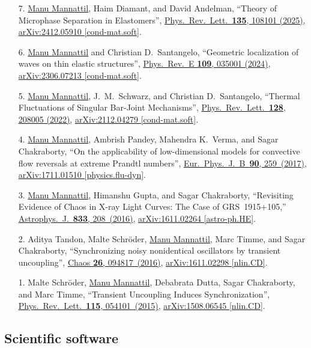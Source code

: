 \documentclass[10pt,article,oneside]{memoir}
\def\bname{\underline{Manu Mannattil}}    %
\def\doi#1#2{\href{https://doi.org/#1}{#2}}
\def\arxiv#1#2{\href{https://arxiv.org/abs/#1}{arXiv:#1 [#2]}}
\begin{document}
\begin{enumerate}
  \item[7.]
    \bname, Haim Diamant, and David Andelman,
    ``Theory of Microphase Separation in Elastomers'',
    \doi{10.1103/5q7m-3fpn}{Phys.~Rev.~Lett.~\textbf{135}, 108101 (2025)},
    \arxiv{2412.05910}{cond-mat.soft}.

  \item[6.]
    {\bname} and Christian D.~Santangelo,
    ``Geometric localization of waves on thin elastic structures'',
    \doi{10.1103/PhysRevE.109.035001}{Phys.~Rev.~E \textbf{109}, 035001 (2024)},
    \arxiv{2306.07213}{cond-mat.soft}.

  \item[5.]
    \bname, J.~M.~Schwarz, and Christian D.~Santangelo,
    ``Thermal Fluctuations of Singular Bar-Joint Mechanisms'',
    \doi{10.1103/PhysRevLett.128.208005}{Phys.~Rev.~Lett.~\textbf{128}, 208005 (2022)},
    \arxiv{2112.04279}{cond-mat.soft}.

  \item[4.]
    \bname, Ambrish Pandey, Mahendra K.~Verma, and Sagar Chakraborty,
    ``On the applicability of low-dimensional models for convective flow reversals at extreme Prandtl numbers'',
    \doi{10.1140/epjb/e2017-80391-1}{Eur.~Phys.~J.~B~\textbf{90}, 259~(2017)},
    \arxiv{1711.01510}{physics.flu-dyn}.

  \item[3.]
    \bname, Himanshu Gupta, and Sagar Chakraborty,
    ``Revisiting Evidence of Chaos in X-ray Light Curves: The Case of GRS~1915+105,''
    \doi{10.3847/1538-4357/833/2/208}{Astrophys.~J.~\textbf{833}, 208~(2016)},
    \arxiv{1611.02264}{astro-ph.HE}.

  \item[2.]
    Aditya Tandon, Malte Schr\"{o}der, \bname, Marc Timme, and Sagar Chakraborty,
    ``Synchronizing noisy nonidentical oscillators by transient uncoupling'',
    \doi{10.1063/1.4959141}{Chaos \textbf{26}, 094817~(2016)},
    \arxiv{1611.02298}{nlin.CD}.

  \item[1.]
    Malte Schr\"{o}der, \bname, Debabrata Dutta, Sagar Chakraborty, and Marc Timme,
    ``Transient Uncoupling Induces Synchronization'',
    \doi{10.1103/PhysRevLett.115.054101}{Phys.~Rev.~Lett.~\textbf{115}, 054101~(2015)},
    \arxiv{1508.06545}{nlin.CD}.
\end{enumerate}

\subsection{Scientific software}
\end{document}
